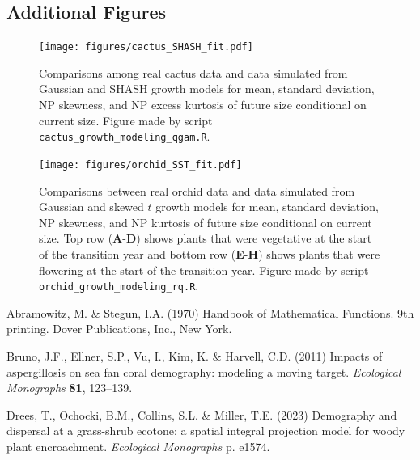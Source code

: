 \documentclass[12pt]{article}
\begin{document}
\begin{spacing}{1.35}
	\section{Additional Figures}
	\label{sec:additionalFigs}
	
	\begin{figure}[h!]
		\centering
		\texttt{[image: figures/cactus\_SHASH\_fit.pdf]}
		\caption{Comparisons among real cactus data and data simulated from Gaussian and SHASH growth models for mean, standard deviation, NP skewness, and NP excess kurtosis of future size conditional on current size. Figure made by script \texttt{cactus\_growth\_modeling\_qgam.R}.}
		\label{fig:cactus_fit}
	\end{figure} 
	
	\begin{figure}[h!]
		\centering
		\texttt{[image: figures/orchid\_SST\_fit.pdf]}
		\caption{Comparisons between real orchid data and data simulated from Gaussian and skewed $t$ growth models for mean, standard deviation, NP skewness, and NP kurtosis of future size conditional on current size. Top row (\textbf{A}-\textbf{D}) shows plants that were vegetative at the start of the transition year and bottom row (\textbf{E}-\textbf{H}) shows plants that were flowering at the start of the transition year. Figure made by script \texttt{orchid\_growth\_modeling\_rq.R}.}
		\label{fig:orchid_SST_fit}
	\end{figure} 
	
	\clearpage
	\newpage 
	
	\begin{thebibliography}{62}
		\providecommand{\natexlab}[1]{#1}
		
		Abramowitz, M. \& Stegun, I.A. (1970) {Handbook of Mathematical Functions. 9th printing.}
		{D}over Publications, Inc., New York.
		
		Bruno, J.F., Ellner, S.P., Vu, I., Kim, K. \& Harvell, C.D. (2011) Impacts of
		aspergillosis on sea fan coral demography: modeling a moving target.
		\emph{Ecological Monographs} \textbf{81}, 123--139.
		
		Drees, T., Ochocki, B.M., Collins, S.L. \& Miller, T.E. (2023) Demography and
		dispersal at a grass-shrub ecotone: a spatial integral projection model for
		woody plant encroachment. \emph{Ecological Monographs} p. e1574.
		

\end{thebibliography}
\end{spacing}
\end{document}
